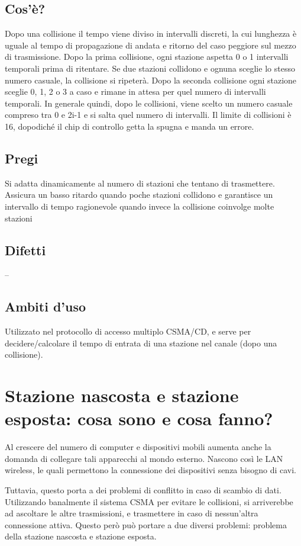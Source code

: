 \subsection{Cos'è?}
Dopo una collisione il tempo viene diviso in intervalli discreti, la cui lunghezza è uguale al tempo di propagazione di andata e ritorno del caso peggiore sul mezzo di trasmissione.
Dopo la prima collisione, ogni stazione aspetta 0 o 1 intervalli temporali prima di ritentare. Se due stazioni collidono e ognuna sceglie lo stesso numero casuale, la collisione si ripeterà. Dopo la seconda collisione ogni stazione sceglie 0, 1, 2 o 3 a caso e rimane in attesa per quel numero di intervalli temporali. In generale quindi, dopo le collisioni, viene scelto un numero casuale compreso tra 0 e 2i-1 e si salta quel numero di intervalli. Il limite di collisioni è 16, dopodiché il chip di controllo getta la spugna e manda un errore.

\subsection{Pregi}
Si adatta dinamicamente al numero di stazioni che tentano di trasmettere.\\
Assicura un basso ritardo quando poche stazioni collidono e garantisce un intervallo di tempo ragionevole quando invece la collisione coinvolge molte stazioni

\subsection{Difetti}
--

\subsection{Ambiti d'uso}
Utilizzato nel protocollo di accesso multiplo CSMA/CD, e serve per decidere/calcolare il tempo di entrata di una stazione nel canale (dopo una collisione).
\section{Stazione nascosta e stazione esposta: cosa sono e cosa fanno?}

Al crescere del numero di computer e dispositivi mobili aumenta anche la domanda di collegare tali apparecchi al mondo esterno.
Nascono così le LAN wireless, le quali permettono la connessione dei dispositivi senza bisogno di cavi.

Tuttavia, questo porta a dei problemi di conflitto in caso di scambio di dati.
Utilizzando banalmente il sistema CSMA per evitare le collisioni, si arriverebbe ad ascoltare le altre trasmissioni, e trasmettere in caso di nessun'altra connessione attiva.
Questo però può portare a due diversi problemi: problema della stazione nascosta e stazione esposta.
